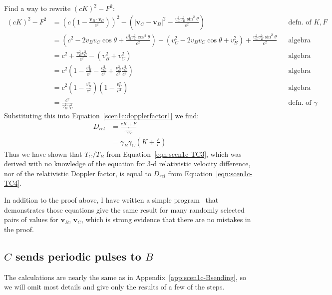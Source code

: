 \documentclass[a4paper]{article}
\theoremstyle{plain}
\theoremstyle{definition}
\newcommand{\vect}[1]{\mathbf{#1}}
\begin{document}
Find a way to rewrite $(cK)^2-F^2$:
\begin{align}
(cK)^2 - F^2
  & = \left( c (1 - \frac{\vect{v}_B \cdot \vect{v}_C}{c^2}) \right)^2 - \left( |\vect{v}_C - \vect{v}_B|^2 - \frac{v_C^2 v_B^2 \sin^2 \theta}{c^2} \right) & & \text{defn. of $K,F$} \nonumber \\
  & = \left( c^2 - 2 v_B v_C \cos \theta + \frac{v_B^2 v_C^2 \cos^2 \theta}{c^2} \right) - (v_C^2 - 2 v_B v_C \cos \theta + v_B^2) + \frac{v_C^2 v_B^2 \sin^2 \theta}{c^2} & & \text{algebra} \nonumber \\
  & = c^2 + \frac{v_B^2 v_C^2}{c^2} - (v_B^2 + v_C^2) & & \text{algebra} \nonumber \\
  & = c^2 \left( 1 - \frac{v_B^2}{c^2} - \frac{v_C^2}{c^2} + \frac{v_B^2}{c^2} \frac{v_C^2}{c^2} \right) & & \text{algebra} \nonumber \\
  & = c^2 \left( 1 - \frac{v_B^2}{c^2} \right) \left( 1 - \frac{v_C^2}{c^2} \right) & & \text{algebra} \nonumber \\
  & = \frac{c^2}{\gamma_B^2 \gamma_C^2} & & \text{defn. of $\gamma$}
\end{align}
Substituting this into Equation~\eqref{scen1c:dopplerfactor1}
we find:
\begin{align}
D_{rel}
  & = \frac{cK+F}{\frac{c}{\gamma_B \gamma_C}} \nonumber \\
  & = \gamma_B \gamma_C \left( K+\frac{F}{c} \right) \label{eqn:scen1c-TC4}
\end{align}
Thus we have shown that $T_C/T_B$ from
Equation~\eqref{eqn:scen1c-TC3}, which was derived with no knowledge
of the equation for 3-d relativistic velocity difference, nor of the
relativistic Doppler factor, is equal to $D_{rel}$ from
Equation~\eqref{eqn:scen1c-TC4}.

In addition to the proof above, I have written a simple
program~\cite{FingerhutScenario1c-program} that demonstrates those
equations give the same result for many randomly selected pairs of
values for $\vect{v}_B$, $\vect{v}_C$, which is strong
evidence that there are no mistakes in the proof.


\subsection{$C$ sends periodic pulses to $B$}
\label{app:scen1c-Csending}

The calculations are nearly the same as in
Appendix~\ref{app:scen1c-Bsending}, so we will omit most details and
give only the results of a few of the steps.
\end{document}

